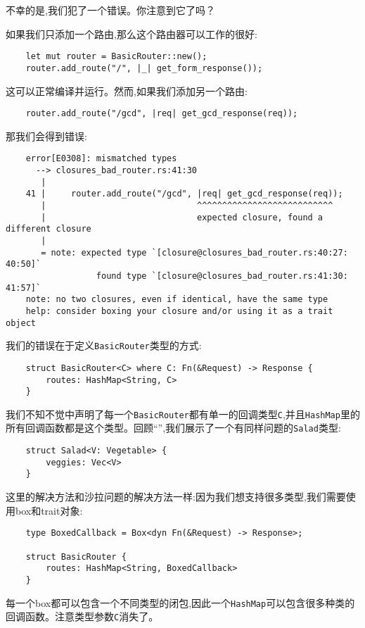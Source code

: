 不幸的是,我们犯了一个错误。你注意到它了吗？

如果我们只添加一个路由,那么这个路由器可以工作的很好:
\begin{verbatim}
    let mut router = BasicRouter::new();
    router.add_route("/", |_| get_form_response());
\end{verbatim}

这可以正常编译并运行。然而,如果我们添加另一个路由:
\begin{verbatim}
    router.add_route("/gcd", |req| get_gcd_response(req));
\end{verbatim}

那我们会得到错误:
\begin{verbatim}
    error[E0308]: mismatched types
      --> closures_bad_router.rs:41:30
       |
    41 |     router.add_route("/gcd", |req| get_gcd_response(req));
       |                              ^^^^^^^^^^^^^^^^^^^^^^^^^^^
       |                              expected closure, found a different closure
       |
       = note: expected type `[closure@closures_bad_router.rs:40:27: 40:50]`
                  found type `[closure@closures_bad_router.rs:41:30: 41:57]`
    note: no two closures, even if identical, have the same type
    help: consider boxing your closure and/or using it as a trait object
\end{verbatim}

我们的错误在于定义\texttt{BasicRouter}类型的方式:
\begin{verbatim}
    struct BasicRouter<C> where C: Fn(&Request) -> Response {
        routes: HashMap<String, C>
    }
\end{verbatim}

我们不知不觉中声明了每一个\texttt{BasicRouter}都有单一的回调类型\texttt{C},并且\texttt{HashMap}里的所有回调函数都是这个类型。回顾“”,我们展示了一个有同样问题的\texttt{Salad}类型:
\begin{verbatim}
    struct Salad<V: Vegetable> {
        veggies: Vec<V>
    }
\end{verbatim}
这里的解决方法和沙拉问题的解决方法一样:因为我们想支持很多类型,我们需要使用box和trait对象:
\begin{verbatim}
    type BoxedCallback = Box<dyn Fn(&Request) -> Response>;

    struct BasicRouter {
        routes: HashMap<String, BoxedCallback>
    }
\end{verbatim}

每一个box都可以包含一个不同类型的闭包,因此一个\texttt{HashMap}可以包含很多种类的回调函数。注意类型参数\texttt{C}消失了。

